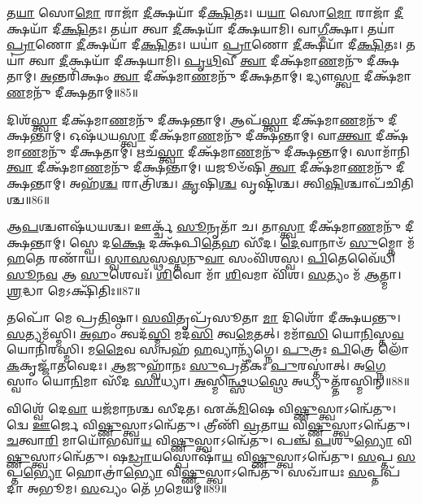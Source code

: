 𑌤\-\ul{𑌯𑌾} 𑌸𑍋\-\ul{𑌮𑍋} 𑌰𑌾𑌜𑌾᳴ \ul{𑌦𑍀}\-𑌕𑍍𑌷𑌯𑌾᳴ 𑌦𑍀\-\ul{𑌕𑍍𑌷𑌿}\-𑌤𑌃।
𑌯\-\ul{𑌯𑌾} 𑌸𑍋\-\ul{𑌮𑍋} 𑌰𑌾𑌜𑌾᳴ \ul{𑌦𑍀}\-𑌕𑍍𑌷𑌯𑌾᳴ 𑌦𑍀\-\ul{𑌕𑍍𑌷𑌿}\-𑌤𑌃।
𑌤𑌯𑌾॑ 𑌤𑍍𑌵𑌾 \ul{𑌦𑍀}\-𑌕𑍍𑌷𑌯𑌾᳴ 𑌦𑍀𑌕𑍍𑌷𑌯𑌾𑌮𑌿।
𑌵𑌾\-\ul{𑌗𑍍𑌦𑍀}\-𑌕𑍍𑌷𑌾।
𑌤𑌯𑌾॑ \ul{𑌪𑍍𑌰𑌾}\-𑌣𑍋 \ul{𑌦𑍀}\-𑌕𑍍𑌷𑌯𑌾᳴ 𑌦𑍀\-\ul{𑌕𑍍𑌷𑌿}\-𑌤𑌃।
𑌯𑌯𑌾॑ \ul{𑌪𑍍𑌰𑌾}\-𑌣𑍋 \ul{𑌦𑍀}\-𑌕𑍍𑌷𑌯𑌾᳴ 𑌦𑍀\-\ul{𑌕𑍍𑌷𑌿}\-𑌤𑌃।
𑌤𑌯𑌾॑ 𑌤𑍍𑌵𑌾 \ul{𑌦𑍀}\-𑌕𑍍𑌷𑌯𑌾᳴ 𑌦𑍀𑌕𑍍𑌷𑌯𑌾𑌮𑌿।
\-\ul{𑌪𑍃}\-\-\ul{𑌥𑌿}\-𑌵𑍀 \ul{𑌤𑍍𑌵𑌾} 𑌦𑍀𑌕𑍍𑌷᳴𑌮𑌾\-\ul{𑌣}\-𑌮𑌨𑍁᳴ 𑌦𑍀𑌕𑍍𑌷𑌤𑌾𑌮𑍍।
\-\ul{𑌅}\-𑌨𑍍𑌤𑌰𑌿᳴𑌕𑍍𑌷𑌂 \ul{𑌤𑍍𑌵𑌾} 𑌦𑍀𑌕𑍍𑌷᳴𑌮𑌾\-\ul{𑌣}\-𑌮𑌨𑍁᳴ 𑌦𑍀𑌕𑍍𑌷𑌤𑌾𑌮𑍍।
𑌦𑍍𑌯𑍗\-\ul{𑌸𑍍𑌤𑍍𑌵𑌾} 𑌦𑍀𑌕𑍍𑌷᳴𑌮𑌾\-\ul{𑌣}\-𑌮𑌨𑍁᳴ 𑌦𑍀𑌕𑍍𑌷𑌤𑌾𑌮𑍍॥85॥

𑌦𑌿𑌶᳴\-\ul{𑌸𑍍𑌤𑍍𑌵𑌾} 𑌦𑍀𑌕𑍍𑌷᳴𑌮𑌾\-\ul{𑌣}\-𑌮𑌨𑍁᳴ 𑌦𑍀𑌕𑍍𑌷𑌨𑍍𑌤𑌾𑌮𑍍।
𑌆𑌪᳴\-\ul{𑌸𑍍𑌤𑍍𑌵𑌾} 𑌦𑍀𑌕𑍍𑌷᳴𑌮𑌾\-\ul{𑌣}\-𑌮𑌨𑍁᳴ 𑌦𑍀𑌕𑍍𑌷𑌨𑍍𑌤𑌾𑌮𑍍।
𑌓𑌷᳴𑌧𑌯\-\ul{𑌸𑍍𑌤𑍍𑌵𑌾} 𑌦𑍀𑌕𑍍𑌷᳴𑌮𑌾\-\ul{𑌣}\-𑌮𑌨𑍁᳴ 𑌦𑍀𑌕𑍍𑌷𑌨𑍍𑌤𑌾𑌮𑍍।
𑌵𑌾\-\ul{𑌕𑍍𑌤𑍍𑌵𑌾} 𑌦𑍀𑌕𑍍𑌷᳴𑌮𑌾\-\ul{𑌣}\-𑌮𑌨𑍁᳴ 𑌦𑍀𑌕𑍍𑌷𑌤𑌾𑌮𑍍।
𑌋𑌚᳴\-\ul{𑌸𑍍𑌤𑍍𑌵𑌾} 𑌦𑍀𑌕𑍍𑌷᳴𑌮𑌾\-\ul{𑌣}\-𑌮𑌨𑍁᳴ 𑌦𑍀𑌕𑍍𑌷𑌨𑍍𑌤𑌾𑌮𑍍।
𑌸𑌾𑌮𑌾᳴𑌨𑌿 \ul{𑌤𑍍𑌵𑌾} 𑌦𑍀𑌕𑍍𑌷᳴𑌮𑌾\-\ul{𑌣}\-𑌮𑌨𑍁᳴ 𑌦𑍀𑌕𑍍𑌷𑌨𑍍𑌤𑌾𑌮𑍍।
𑌯𑌜𑍂𑍞᳴𑌷𑌿 \ul{𑌤𑍍𑌵𑌾} 𑌦𑍀𑌕𑍍𑌷᳴𑌮𑌾\-\ul{𑌣}\-𑌮𑌨𑍁᳴ 𑌦𑍀𑌕𑍍𑌷𑌨𑍍𑌤𑌾𑌮𑍍।
𑌅𑌹᳴\-\ul{𑌶𑍍𑌚} 𑌰𑌾𑌤𑍍𑌰𑌿᳴𑌶𑍍𑌚।
\-\ul{𑌕𑍃}\-𑌷𑌿\-\ul{𑌶𑍍𑌚} 𑌵𑍃𑌷𑍍𑌟𑌿᳴𑌶𑍍𑌚।
𑌤𑍍𑌵𑌿\-\ul{𑌷𑌿}\-𑌶𑍍𑌚𑌾𑌪᳴𑌚𑌿𑌤𑌿𑌶𑍍𑌚॥86॥

𑌆\-\ul{𑌪}\-𑌶𑍍𑌚𑍗𑌷᳴𑌧𑌯𑌶𑍍𑌚।
𑌊𑌰𑍍𑌕𑍍𑌚᳴ \ul{𑌸𑍂}\-𑌨𑍃𑌤𑌾᳴ 𑌚।
𑌤𑌾\-\ul{𑌸𑍍𑌤𑍍𑌵𑌾} 𑌦𑍀𑌕𑍍𑌷᳴𑌮𑌾\-\ul{𑌣}\-𑌮𑌨𑍁᳴ 𑌦𑍀𑌕𑍍𑌷𑌨𑍍𑌤𑌾𑌮𑍍।
𑌸𑍍𑌵𑍇 𑌦\-\ul{𑌕𑍍𑌷𑍇} 𑌦𑌕𑍍𑌷᳴𑌪𑌿\-\ul{𑌤𑍇}\-𑌹 𑌸𑍀᳴𑌦।
\-\ul{𑌦𑍇}\-𑌵𑌾𑌨𑌾𑍞᳴ \ul{𑌸𑍁}\-𑌮𑍍𑌨𑍋 𑌮᳴\-\ul{𑌹}\-𑌤𑍇 𑌰𑌣𑌾᳴𑌯।
\-\ul{𑌸𑍍𑌵𑌾}\-\-\ul{𑌸}\-𑌸𑍍𑌥\-\ul{𑌸𑍍𑌤}\-𑌨𑍁\-\ul{𑌵𑌾} 𑌸𑌂𑌵𑌿᳴𑌶𑌸𑍍𑌵।
\-\ul{𑌪𑌿}\-𑌤𑍇𑌵𑍈᳴𑌧𑌿 \ul{𑌸𑍂}\-𑌨\-\ul{𑌵} 𑌆 \ul{𑌸𑍁}\-𑌶𑍇𑌵𑌃᳴।
\-\ul{𑌶𑌿}\-𑌵𑍋 𑌮𑌾᳴ \ul{𑌶𑌿}\-𑌵𑌮𑌾 𑌵𑌿᳴𑌶।
\-\ul{𑌸}\-𑌤𑍍𑌯𑌂 𑌮᳴ \ul{𑌆}\-𑌤𑍍𑌮𑌾।
\-\ul{𑌶𑍍𑌰}\-𑌦𑍍𑌧𑌾 𑌮𑍇𑌽𑌕𑍍𑌷𑌿᳴𑌤𑌿𑌃॥87॥

𑌤𑌪𑍋᳴ 𑌮𑍇 𑌪𑍍𑌰\-\ul{𑌤𑌿}\-𑌷𑍍𑌠𑌾।
\-\ul{𑌸}\-\-\ul{𑌵𑌿}\-𑌤𑍃𑌪𑍍𑌰᳴𑌸𑍂𑌤𑌾 \ul{𑌮𑌾} 𑌦𑌿𑌶𑍋᳴ 𑌦𑍀𑌕𑍍𑌷𑌯𑌨𑍍𑌤𑍁।
\-\ul{𑌸}\-𑌤𑍍𑌯𑌮᳴𑌸𑍍𑌮𑌿।
\-\ul{𑌅}\-𑌹𑌂 𑌤𑍍𑌵𑌦᳴\-\ul{𑌸𑍍𑌮𑌿} 𑌮𑌦᳴\-\ul{𑌸𑌿} 𑌤𑍍𑌵\-\ul{𑌮𑍇}\-𑌤𑌤𑍍।
𑌮𑌮𑌾᳴\-\ul{𑌸𑌿} 𑌯𑍋\-\ul{𑌨𑌿}\-𑌸𑍍𑌤\-\ul{𑌵} 𑌯𑍋𑌨𑌿᳴𑌰𑌸𑍍𑌮𑌿।
𑌮\-\ul{𑌮𑍈}\-𑌵 𑌸𑌨𑍍𑌵𑌹᳴ \ul{𑌹}\-𑌵𑍍𑌯𑌾𑌨𑍍𑌯᳴𑌗𑍍𑌨𑍇।
\-\ul{𑌪𑍁}\-𑌤𑍍𑌰𑌃 \ul{𑌪𑌿}\-𑌤𑍍𑌰𑍇 𑌲𑍋᳴\-\ul{𑌕}\-𑌕𑍃𑌜𑍍𑌜𑌾᳴𑌤𑌵𑍇𑌦𑌃।
\-\ul{𑌆}\-𑌜𑍁𑌹𑍍𑌵𑌾᳴𑌨𑌃 \ul{𑌸𑍁}\-𑌪𑍍𑌰𑌤𑍀᳴𑌕𑌃 \ul{𑌪𑍁}\-𑌰𑌸𑍍𑌤𑌾॑𑌤𑍍।
𑌅\-\ul{𑌗𑍍𑌨𑍇} 𑌸𑍍𑌵𑌾𑌂 𑌯𑍋\-\ul{𑌨𑌿}\-𑌮𑌾 𑌸𑍀᳴𑌦 \ul{𑌸𑌾}\-𑌧𑍍𑌯𑌾।
\-\ul{𑌅}\-𑌸𑍍𑌮𑌿\-\ul{𑌨𑍍𑌥𑍍𑌸}\-𑌧\-\ul{𑌸𑍍𑌥𑍇} 𑌅𑌧𑍍𑌯𑍁𑌤𑍍𑌤᳴𑌰𑌸𑍍𑌮𑌿𑌨𑍍॥88॥

𑌵𑌿𑌶𑍍𑌵𑍇᳴ 𑌦𑍇\-\ul{𑌵𑌾} 𑌯𑌜᳴𑌮𑌾𑌨𑌶𑍍𑌚 𑌸𑍀𑌦𑌤।
𑌏𑌕᳴\-\ul{𑌮𑌿}\-𑌷𑍇 𑌵𑌿\-\ul{𑌷𑍍𑌣𑍁}\-𑌸𑍍𑌤𑍍𑌵𑌾\-𑌽𑌨𑍍𑌵𑍇᳴𑌤𑍁।
𑌦𑍍𑌵𑍇 \ul{𑌊}\-𑌰𑍍𑌜𑍇 𑌵𑌿\-\ul{𑌷𑍍𑌣𑍁}\-𑌸𑍍𑌤𑍍𑌵𑌾\-𑌽𑌨𑍍𑌵𑍇᳴𑌤𑍁।
𑌤𑍍𑌰𑍀𑌣𑌿᳴ \ul{𑌵𑍍𑌰}\-𑌤𑌾\-\ul{𑌯} 𑌵𑌿\-\ul{𑌷𑍍𑌣𑍁}\-𑌸𑍍𑌤𑍍𑌵𑌾\-𑌽𑌨𑍍𑌵𑍇᳴𑌤𑍁।
\-\ul{𑌚}\-𑌤𑍍𑌵𑌾\-\ul{𑌰𑌿} 𑌮𑌾𑌯𑍋᳴𑌭𑌵𑌾\-\ul{𑌯} 𑌵𑌿\-\ul{𑌷𑍍𑌣𑍁}\-𑌸𑍍𑌤𑍍𑌵𑌾\-𑌽𑌨𑍍𑌵𑍇᳴𑌤𑍁।
𑌪𑌞𑍍𑌚᳴ \ul{𑌪}\-𑌶𑍁\-\ul{𑌭𑍍𑌯𑍋} 𑌵𑌿\-\ul{𑌷𑍍𑌣𑍁}\-𑌸𑍍𑌤𑍍𑌵𑌾\-𑌽𑌨𑍍𑌵𑍇᳴𑌤𑍁।
𑌷\-\ul{𑌡𑍍𑌰𑌾}\-𑌯𑌸𑍍𑌪𑍋𑌷𑌾᳴\-\ul{𑌯} 𑌵𑌿\-\ul{𑌷𑍍𑌣𑍁}\-𑌸𑍍𑌤𑍍𑌵𑌾\-𑌽𑌨𑍍𑌵𑍇᳴𑌤𑍁।
\-\ul{𑌸}\-𑌪𑍍𑌤 \ul{𑌸}\-𑌪𑍍𑌤\-\ul{𑌭𑍍𑌯𑍋} 𑌹𑍋𑌤𑍍𑌰𑌾॑\-\ul{𑌭𑍍𑌯𑍋} 𑌵𑌿\-\ul{𑌷𑍍𑌣𑍁}\-𑌸𑍍𑌤𑍍𑌵𑌾\-𑌽𑌨𑍍𑌵𑍇᳴𑌤𑍁।
𑌸𑌖𑌾᳴𑌯𑌃 \ul{𑌸}\-𑌪𑍍𑌤𑌪᳴𑌦𑌾 𑌅𑌭𑍂𑌮।
\-\ul{𑌸}\-𑌖𑍍𑌯𑌂 𑌤𑍇᳴ 𑌗𑌮𑍇𑌯𑌮𑍍॥89॥

